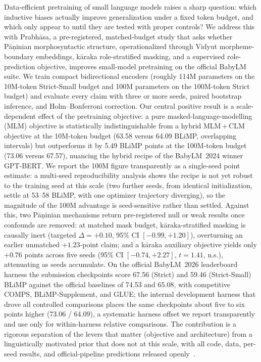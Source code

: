 
Data-efficient pretraining of small language models raises a sharp question: which inductive biases actually improve generalization under a fixed token budget, and which only appear to until they are tested with proper controls? We address this with Prabhāsa, a pre-registered, matched-budget study that asks whether Pāṇinian morphosyntactic structure, operationalized through Vidyut morpheme-boundary embeddings, kāraka role-stratified masking, and a supervised role-prediction objective, improves small-model pretraining on the official BabyLM suite. We train compact bidirectional encoders (roughly 114M parameters on the 10M-token Strict-Small budget and 100M parameters on the 100M-token Strict budget) and evaluate every claim with three or more seeds, paired bootstrap inference, and Holm--Bonferroni correction. Our central positive result is a scale-dependent effect of the pretraining objective: a pure masked-language-modelling (MLM) objective is statistically indistinguishable from a hybrid MLM\,+\,CLM objective at the 10M-token budget (63.58 versus 64.09 BLiMP, overlapping intervals) but outperforms it by 5.49 BLiMP points at the 100M-token budget (73.06 versus 67.57), nuancing the hybrid recipe of the BabyLM~2024 winner GPT-BERT. We report the 100M figure transparently as a single-seed point estimate: a multi-seed reproducibility analysis shows the recipe is not yet robust to the training seed at this scale (two further seeds, from identical initialization, settle at 53--58 BLiMP, with one optimizer trajectory diverging), so the magnitude of the 100M advantage is seed-sensitive rather than settled. Against this, two Pāṇinian mechanisms return pre-registered null or weak results once confounds are removed: at matched mask budget, kāraka-stratified masking is causally inert (targeted $\Delta = +0.10$, 95\% CI $[-0.99, +1.20]$), overturning an earlier unmatched $+1.23$-point claim; and a kāraka auxiliary objective yields only $+0.76$ points across five seeds (95\% CI $[-0.74, +2.27]$, $t=1.41$, n.s.), attenuating as seeds accumulate. On the official BabyLM~2026 leaderboard harness the submission checkpoints score 67.56 (Strict) and 59.46 (Strict-Small) BLiMP against the official baselines of 74.53 and 65.08, with competitive COMPS, BLiMP-Supplement, and GLUE; the internal development harness that drove all controlled comparisons places the same checkpoints about five to six points higher (73.06 / 64.09), a systematic harness offset we report transparently and use only for within-harness relative comparisons. The contribution is a rigorous separation of the levers that matter (objective and architecture) from a linguistically motivated prior that does not at this scale, with all code, data, per-seed results, and official-pipeline predictions released openly~\cite{Hu2024BabyLM}.
